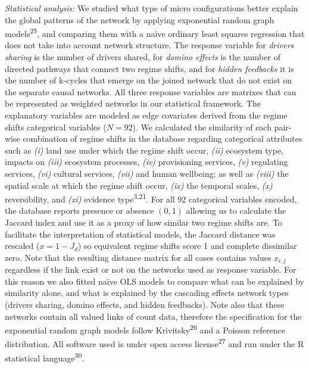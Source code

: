 \documentclass[9pt,]{article}
\begin{document}
\emph{Statistical analysis:} We studied what type of micro
configurations better explain the global patterns of the network by
applying exponential random graph models\textsuperscript{25}, and
comparing them with a naïve ordinary least squares regression that does
not take into account network structure. The response variable for
\emph{drivers sharing} is the number of drivers shared, for \emph{domino
effects} is the number of directed pathways that connect two regime
shifts, and for \emph{hidden feedbacks} it is the number of k-cycles
that emerge on the joined network that do not exist on the separate
causal networks. All three response variables are matrixes that can be
represented as weighted networks in our statistical framework. The
explanatory variables are modeled as edge covariates derived from the
regime shifts categorical variables (\(N=92\)). We calculated the
similarity of each pair-wise combination of regime shifts in the
database regarding categorical attributes such as \emph{(i)} land use
under which the regime shift occur, \emph{(ii)} ecosystem type, impacts
on \emph{(iii)} ecosystem processes, \emph{(iv)} provisioning services,
\emph{(v)} regulating services, \emph{(vi)} cultural services,
\emph{(vii)} and human wellbeing; as well as \emph{(viii)} the spatial
scale at which the regime shift occur, \emph{(ix)} the temporal scales,
\emph{(x)} reversibility, and \emph{(xi)} evidence
type\textsuperscript{3,21}. For all \(92\) categorical variables
encoded, the database reports presence or absence \((0,1)\) allowing us
to calculate the Jaccard index and use it as a proxy of how similar two
regime shifts are. To facilitate the interpretation of statistical
models, the Jaccard distance was rescaled (\(x =1 - J_{d}\)) so
equivalent regime shifts score 1 and complete dissimilar zero. Note that
the resulting distance matrix for all cases contains values \(x_{i,j}\)
regardless if the link exist or not on the networks used as response
variable. For this reason we also fitted naïve OLS models to compare
what can be explained by similarity alone, and what is explained by the
cascading effects network types (drivers sharing, domino effects, and
hidden feedbacks). Note also that these networks contain all valued
links of count data, therefore the specification for the exponential
random graph models follow Krivitsky\textsuperscript{26} and a Poisson
reference distribution. All software used is under open access
license\textsuperscript{27} and run under the R statistical
language\textsuperscript{30}.
\end{document}
